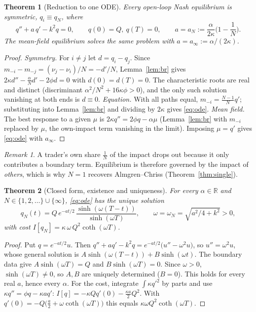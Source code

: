 \documentclass[11pt]{article}
\newtheorem{theorem}{Theorem}
\theoremstyle{definition}
\theoremstyle{remark}
\newtheorem{remark}{Remark}
\newcommand{\R}{\mathbb{R}}
\begin{document}
\begin{theorem}[Reduction to one ODE]\label{thm:ode}
Every open-loop Nash equilibrium is symmetric, $q_i\equiv q_N$, where
\begin{equation}\label{eq:ode}
q'' + a\,q' - k^2 q = 0,\qquad q(0)=Q,\ q(T)=0,\qquad a = a_N := \frac{\alpha}{2\kappa}\Big(1-\frac1N\Big).
\end{equation}
The mean-field equilibrium solves the same problem with $a=a_\infty:=\alpha/(2\kappa)$.
\end{theorem}
\begin{proof}
\emph{Symmetry.} For $i\neq j$ let $d=q_i-q_j$. Since $m_{-i}-m_{-j}=(\nu_j-\nu_i)/N=-d'/N$,
Lemma~\ref{lem:br} gives $2\kappa d''-\tfrac{\alpha}{N}d'-2\phi d=0$ with $d(0)=d(T)=0$. The
characteristic roots are real and distinct (discriminant $\alpha^2/N^2+16\kappa\phi>0$), and
the only such solution vanishing at both ends is $d\equiv0$.
\emph{Equation.} With all paths equal, $m_{-i}=\tfrac{N-1}{N}q'$; substituting into
Lemma~\ref{lem:br} and dividing by $2\kappa$ gives \eqref{eq:ode}.
\emph{Mean field.} The best response to a given $\mu$ is $2\kappa q''=2\phi q-\alpha\mu$
(Lemma~\ref{lem:br} with $m_{-i}$ replaced by $\mu$, the own-impact term vanishing in the
limit). Imposing $\mu=q'$ gives \eqref{eq:ode} with $a_\infty$.
\end{proof}

\begin{remark}
A trader's own share $\tfrac1N$ of the impact drops out because it only contributes a
boundary term. Equilibrium is therefore governed by the impact of \emph{others}, which is why
$N=1$ recovers Almgren--Chriss (Theorem~\ref{thm:single}).
\end{remark}

\begin{theorem}[Closed form, existence and uniqueness]\label{thm:closed}
For every $\alpha\in\R$ and $N\in\{1,2,\dots\}\cup\{\infty\}$, \eqref{eq:ode} has the unique solution
\[
q_N(t) = Q\,e^{-a t/2}\,\frac{\sinh(\omega(T-t))}{\sinh(\omega T)},\qquad
\omega=\omega_N=\sqrt{a^2/4+k^2}>0,
\]
with cost $I[q_N] = \kappa\,\omega\, Q^2\coth(\omega T)$.
\end{theorem}
\begin{proof}
Put $q=e^{-at/2}u$. Then $q''+aq'-k^2q=e^{-at/2}\big(u''-\omega^2u\big)$, so $u''=\omega^2u$,
whose general solution is $A\sinh(\omega(T-t))+B\sinh(\omega t)$. The boundary data give
$A\sinh(\omega T)=Q$ and $B\sinh(\omega T)=0$. Since $\omega>0$, $\sinh(\omega T)\neq0$, so
$A,B$ are uniquely determined ($B=0$). This holds for every real $a$, hence every $\alpha$.
For the cost, integrate $\int\kappa q'^2$ by parts and use $\kappa q''=\phi q-\kappa a q'$:
$I[q]=-\kappa Qq'(0)-\tfrac{\kappa a}{2}Q^2$. With
$q'(0)=-Q\big(\tfrac a2+\omega\coth(\omega T)\big)$ this equals $\kappa\omega Q^2\coth(\omega T)$.
\end{proof}
\end{document}
